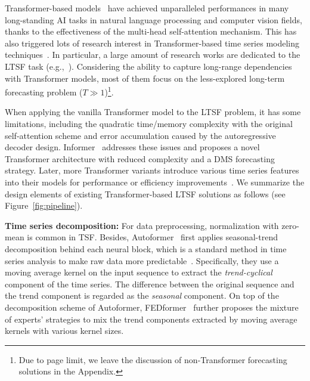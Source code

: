 \documentclass[10pt,twocolumn,letterpaper]{article}
\begin{document}
Transformer-based models~\cite{vaswani2017attention} have achieved unparalleled performances in many long-standing AI tasks in natural language processing and computer vision fields, thanks to the effectiveness of the multi-head self-attention mechanism. This has also triggered lots of research interest in Transformer-based time series modeling techniques~\cite{wen2022transformers,minhao2021t}. In particular, a large amount of research works are dedicated to the LTSF task (e.g.,~\cite{li2019LogTrans,liu2021pyraformer,xu2021autoformer,informer,zhou2022fedformer}). Considering the ability to capture long-range dependencies with Transformer models, most of them focus on the less-explored long-term forecasting problem ($T\gg1$)\footnote{Due to page limit, we leave the discussion of non-Transformer forecasting solutions in the Appendix.}. 
 


When applying the vanilla Transformer model to the LTSF problem, it has some limitations, including the quadratic time/memory complexity with the original self-attention scheme and error accumulation caused by the autoregressive decoder design. Informer~\cite{informer} addresses these issues and proposes a novel Transformer architecture with reduced complexity and a DMS forecasting strategy. Later, more Transformer variants 
introduce various time series features into their models for performance or efficiency improvements~\cite{liu2021pyraformer,xu2021autoformer,zhou2022fedformer}. We summarize the design elements of existing Transformer-based LTSF solutions as follows (see Figure~\ref{fig:pipeline}).




\noindent\textbf{Time series decomposition:}
For data preprocessing, normalization with zero-mean is common in TSF. Besides, Autoformer~\cite{xu2021autoformer} first applies seasonal-trend decomposition behind each neural block, which is a standard method in time series analysis to make raw data more predictable~\cite{RBCleveland1990STLA,hamilton2020time}. Specifically, they use a moving average kernel on the input sequence to extract the \emph{trend-cyclical} component of the time series. The difference between the original sequence and the trend component is regarded as the \emph{seasonal} component. 
On top of the decomposition scheme of Autoformer, FEDformer~\cite{zhou2022fedformer} further proposes the mixture of experts' strategies to mix the trend components extracted by moving average kernels with various kernel sizes. 
\end{document}
